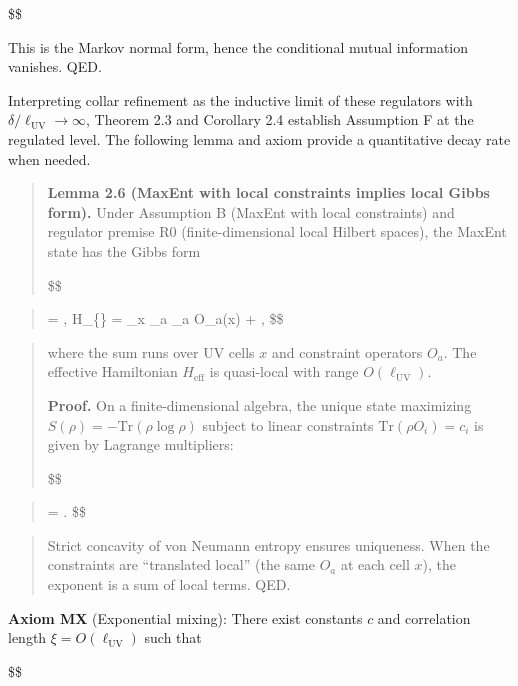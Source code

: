 \documentclass[11pt,a4paper]{article}
\theoremstyle{remark}
\begin{document}
\$\$

This is the Markov normal form, hence the conditional mutual information
vanishes. QED.

Interpreting collar refinement as the inductive limit of these regulators with
\(\delta/\ell_{\mathrm{UV}} \to \infty\), Theorem 2.3 and Corollary 2.4 establish Assumption F
at the regulated level. The following lemma and axiom provide a quantitative
decay rate when needed.

\begin{quote}
\textbf{Lemma 2.6 (MaxEnt with local constraints implies local Gibbs form).}
Under Assumption B (MaxEnt with local constraints) and regulator premise R0
(finite-dimensional local Hilbert spaces), the MaxEnt state has the Gibbs form

\$\$
\end{quote}

\begin{quote}
\omega = ,
\qquad
H\_\{\} = \sum\_x \sum\_a \lambda\_a O\_a(x) + ,
\$\$
\end{quote}

\begin{quote}
where the sum runs over UV cells \(x\) and constraint operators \(O_a\). The
effective Hamiltonian \(H_{\mathrm{eff}}\) is quasi-local with range
\(O(\ell_{\mathrm{UV}})\).

\textbf{Proof.} On a finite-dimensional algebra, the unique state maximizing
\(S(\rho) = -\mathrm{Tr}(\rho \log \rho)\) subject to linear constraints
\(\mathrm{Tr}(\rho O_i) = c_i\) is given by Lagrange multipliers:

\$\$
\end{quote}

\begin{quote}
\rho = .
\$\$
\end{quote}

\begin{quote}
Strict concavity of von Neumann entropy ensures uniqueness. When the
constraints are ``translated local'' (the same \(O_a\) at each cell \(x\)), the
exponent is a sum of local terms. QED.
\end{quote}

\textbf{Axiom MX} (Exponential mixing): There exist constants \(c\) and correlation
length \(\xi = O(\ell_{\mathrm{UV}})\) such that

\$\$
\end{document}

